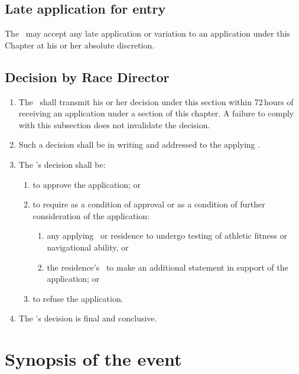 \documentclass[12pt]{report}
\begin{document}
  \section{Late application for entry}
  \begin{fenumerate}
    \item The \RaceDirector\ may accept any late application or variation to an application under this Chapter at his or her absolute discretion.
  \end{fenumerate}
  \section{Decision by Race Director}%
  \begin{enumerate}
    \item The \RaceDirector\ shall transmit his or her decision under this section within 72\,hours of receiving an application under a section of this chapter. A failure to comply with this subsection does not invalidate the decision.
    \item Such a decision shall be in writing and addressed to the applying \Coach.
    \item The \RaceDirector's decision shall be:
     \begin{enumerate}
     \item to approve the application; or
     \item to require as a condition of approval or as a condition of further consideration of the application:
      \begin{enumerate}
      \item any applying \competitor\ or residence to undergo testing of athletic fitness or navigational ability, or
       \item the residence's \Coach\ to make an additional statement in support of the application; or
         \end{enumerate}
         \item to refuse the application.
     \end{enumerate}
     \item The \RaceDirector's decision is final and conclusive.
  \end{enumerate}
  \chapter{Synopsis of the event}\label{chapter:Synopsis}
\end{document}
